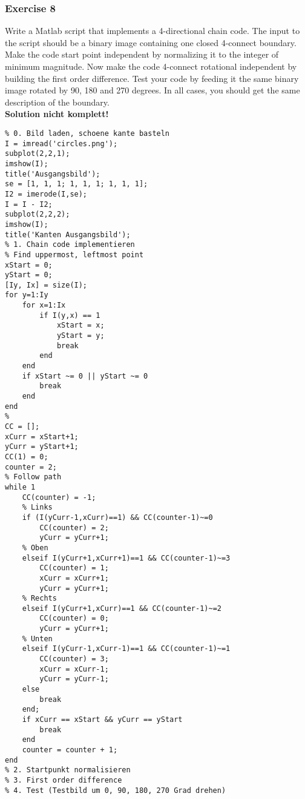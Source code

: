 \subsubsection{Exercise 8}
Write a Matlab script that implements a 4-directional chain code. The input to the script should be a binary image containing one closed 4-connect boundary. Make the code start point independent by normalizing it to the integer of minimum magnitude. Now make the code 4-connect rotational independent by building the first order difference. Test your code by feeding it the same binary image rotated by 90, 180 and 270 degrees. In all cases, you should get the same description of the boundary.\\
\textbf{Solution nicht komplett!}
\begin{lstlisting}
% 0. Bild laden, schoene kante basteln
I = imread('circles.png');
subplot(2,2,1);
imshow(I);
title('Ausgangsbild');
se = [1, 1, 1; 1, 1, 1; 1, 1, 1];
I2 = imerode(I,se);
I = I - I2;
subplot(2,2,2);
imshow(I);
title('Kanten Ausgangsbild');
% 1. Chain code implementieren
% Find uppermost, leftmost point
xStart = 0;
yStart = 0;
[Iy, Ix] = size(I);
for y=1:Iy
    for x=1:Ix
        if I(y,x) == 1
            xStart = x;
            yStart = y;
            break
        end
    end
    if xStart ~= 0 || yStart ~= 0
        break
    end
end
%
CC = [];
xCurr = xStart+1;
yCurr = yStart+1;
CC(1) = 0;
counter = 2;
% Follow path
while 1
    CC(counter) = -1;
    % Links
    if (I(yCurr-1,xCurr)==1) && CC(counter-1)~=0
        CC(counter) = 2;
        yCurr = yCurr+1;
    % Oben
    elseif I(yCurr+1,xCurr+1)==1 && CC(counter-1)~=3
        CC(counter) = 1;   
        xCurr = xCurr+1;
        yCurr = yCurr+1;
    % Rechts
    elseif I(yCurr+1,xCurr)==1 && CC(counter-1)~=2
        CC(counter) = 0;   
        yCurr = yCurr+1;
    % Unten
    elseif I(yCurr-1,xCurr-1)==1 && CC(counter-1)~=1
        CC(counter) = 3; 
        xCurr = xCurr-1;
        yCurr = yCurr-1;
    else
        break
    end;
    if xCurr == xStart && yCurr == yStart
        break
    end
    counter = counter + 1;
end
% 2. Startpunkt normalisieren
% 3. First order difference
% 4. Test (Testbild um 0, 90, 180, 270 Grad drehen)
\end{lstlisting}